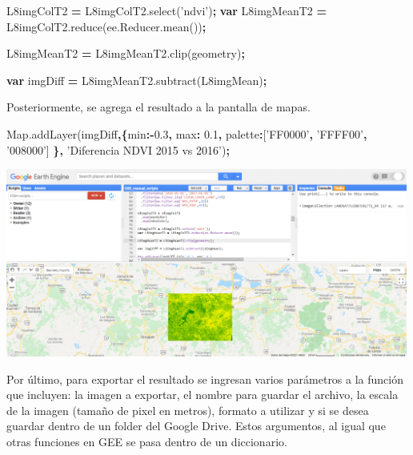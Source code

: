 \documentclass[
]{article}
\newenvironment{Shaded}{\begin{snugshade}}{\end{snugshade}}
\newcommand{\AttributeTok}[1]{\textcolor[rgb]{0.77,0.63,0.00}{#1}}
\newcommand{\DataTypeTok}[1]{\textcolor[rgb]{0.13,0.29,0.53}{#1}}
\newcommand{\FloatTok}[1]{\textcolor[rgb]{0.00,0.00,0.81}{#1}}
\newcommand{\KeywordTok}[1]{\textcolor[rgb]{0.13,0.29,0.53}{\textbf{#1}}}
\newcommand{\NormalTok}[1]{#1}
\newcommand{\OperatorTok}[1]{\textcolor[rgb]{0.81,0.36,0.00}{\textbf{#1}}}
\newcommand{\StringTok}[1]{\textcolor[rgb]{0.31,0.60,0.02}{#1}}
\newcommand{\VariableTok}[1]{\textcolor[rgb]{0.00,0.00,0.00}{#1}}
\begin{document}
\begin{Shaded}
\begin{Highlighting}[]
\NormalTok{L8imgColT2 }\OperatorTok{=} \VariableTok{L8imgColT2}\NormalTok{.}\AttributeTok{select}\NormalTok{(}\StringTok{'ndvi'}\NormalTok{)}\OperatorTok{;}
\KeywordTok{var}\NormalTok{ L8imgMeanT2 }\OperatorTok{=} \VariableTok{L8imgColT2}\NormalTok{.}\AttributeTok{reduce}\NormalTok{(}\VariableTok{ee}\NormalTok{.}\VariableTok{Reducer}\NormalTok{.}\AttributeTok{mean}\NormalTok{())}\OperatorTok{;}

\NormalTok{L8imgMeanT2 }\OperatorTok{=} \VariableTok{L8imgMeanT2}\NormalTok{.}\AttributeTok{clip}\NormalTok{(geometry)}\OperatorTok{;}

\KeywordTok{var}\NormalTok{ imgDiff }\OperatorTok{=} \VariableTok{L8imgMeanT2}\NormalTok{.}\AttributeTok{subtract}\NormalTok{(L8imgMean)}\OperatorTok{;}  
\end{Highlighting}
\end{Shaded}

Posteriormente, se agrega el resultado a la pantalla de mapas.

\begin{Shaded}
\begin{Highlighting}[]
\VariableTok{Map}\NormalTok{.}\AttributeTok{addLayer}\NormalTok{(imgDiff}\OperatorTok{,\{}\DataTypeTok{min}\OperatorTok{:-}\FloatTok{0.3}\OperatorTok{,} \DataTypeTok{max}\OperatorTok{:} \FloatTok{0.1}\OperatorTok{,} 
  \DataTypeTok{palette}\OperatorTok{:}\NormalTok{[}\StringTok{'FF0000'}\OperatorTok{,} \StringTok{'FFFF00'}\OperatorTok{,} \StringTok{'008000'}\NormalTok{] }\OperatorTok{\},} 
  \StringTok{'Diferencia NDVI 2015 vs 2016'}\NormalTok{)}\OperatorTok{;}
\end{Highlighting}
\end{Shaded}

\includegraphics[width=500px]{Img/imDifNDVI}

Por último, para exportar el resultado se ingresan varios parámetros a
la función que incluyen: la imagen a exportar, el nombre para guardar el
archivo, la escala de la imagen (tamaño de pixel en metros), formato a
utilizar y si se desea guardar dentro de un folder del Google Drive.
Estos argumentos, al igual que otras funciones en GEE se pasa dentro de
un diccionario.
\end{document}
